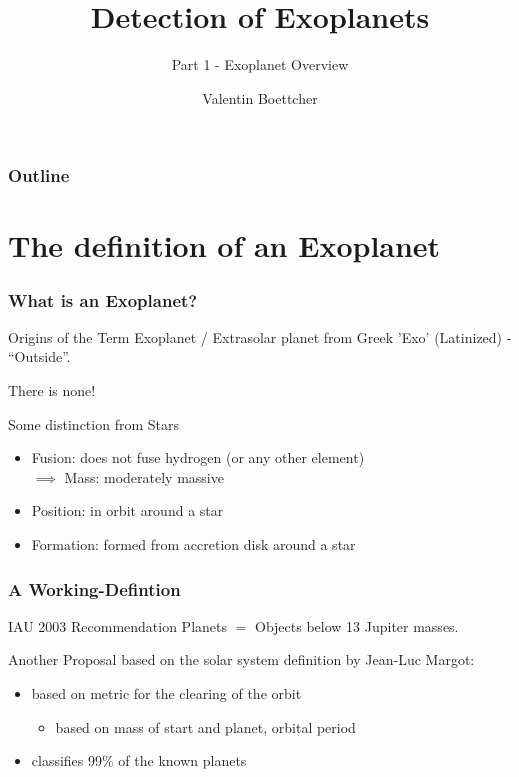 \documentclass[presentation,t,aspectratio=169]{beamer}
\title{Detection of Exoplanets}
\subtitle{Part 1 - Exoplanet Overview}
\author{Valentin Boettcher}
\begin{document}
\begin{frame}
  \titlepage
\end{frame}

{  
  \begin{frame}[plain]
  \end{frame}
}

\begin{frame}
  \frametitle{Outline}
  \tableofcontents[pausesections]
\end{frame}

\section{The definition of an Exoplanet}
\begin{frame}
  \frametitle{What is an Exoplanet?}
  \begin{block}{Origins of the Term}
    Exoplanet / Extrasolar planet from Greek 'Exo' (Latinized)
    - ``Outside''.
  \end{block}
  \pause
  \begin{definition}
    There is none!
  \end{definition}
  \begin{block}{Some distinction from Stars}
    \begin{itemize}
    \item Fusion: does not fuse hydrogen (or any other element)
      \\ $\implies$ Mass: moderately massive
    \item Position: in orbit around a star
    \item Formation: formed from accretion disk around a star
    \end{itemize}    
  \end{block}
\end{frame}
  \begin{frame}
    \frametitle{A Working-Defintion}
    \begin{block}{IAU 2003 Recommendation}
      Planets $=$ Objects below 13 Jupiter masses.
    \end{block}
    \pause
    Another Proposal based on the solar system definition by Jean-Luc Margot:
    \begin{itemize}
    \item based on metric for the clearing of the orbit
      \begin{itemize}
      \item based on mass of start and planet, orbital period
      \end{itemize}
    \item classifies 99\% of the known planets
    \end{itemize}
  \end{frame}
\end{document}
